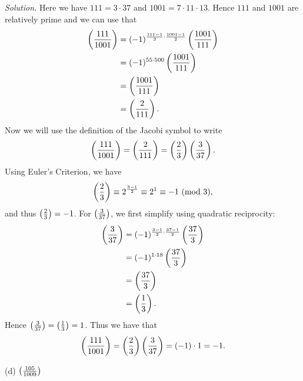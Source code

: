 \documentclass{article}
\newcommand{\Mod}[1]{\ (\mathrm{mod}\ #1)}
\newcommand{\Leg}[2]{\del{\frac{#1}{#2}}}
\begin{document}
\textit{Solution.}
Here we have $111 = 3 \cdot 37$ and $1001 = 7 \cdot 11 \cdot 13$.
Hence $111$ and $1001$ are relatively prime and we can use that
%
\begin{align*}
    \Leg{111}{1001}
    &= (-1)^{\frac{111 - 1}{2} \cdot \frac{1001 - 1}{2}} \Leg{1001}{111} \\
    &= (-1)^{55 \cdot 500} \Leg{1001}{111} \\
    &= \Leg{1001}{111} \\
    &= \Leg{2}{111}
    .
\end{align*}
%
Now we will use the definition of the Jacobi symbol to write
%
\begin{equation*}
    \Leg{111}{1001} = \Leg{2}{111} = \Leg{2}{3} \Leg{3}{37}
    .
\end{equation*}
%
Using Euler's Criterion, we have
%
\begin{equation*}
    \Leg{2}{3} \equiv 2^{\frac{3 - 1}{2}} \equiv 2^1 \equiv -1 \Mod{3}
    ,
\end{equation*}
%
and thus $\Leg{2}{3} = -1$. For $\Leg{3}{37}$, we first simplify using
quadratic reciprocity:
%
\begin{align*}
    \Leg{3}{37}
    &= (-1)^{\frac{3 - 1}{2} \cdot \frac{37 - 1}{2}} \Leg{37}{3} \\
    &= (-1)^{1 \cdot 18} \Leg{37}{3} \\
    &= \Leg{37}{3} \\
    &= \Leg{1}{3}
    .
\end{align*}
%
Hence $\Leg{3}{37} = \Leg{1}{3} = 1$. Thus we have that
%
\begin{equation*}
    \Leg{111}{1001} = \Leg{2}{3} \Leg{3}{37} = (-1) \cdot 1 = -1
    .
\end{equation*}

\vspace{5mm}

(d) $\Leg{105}{1009}$
\end{document}

